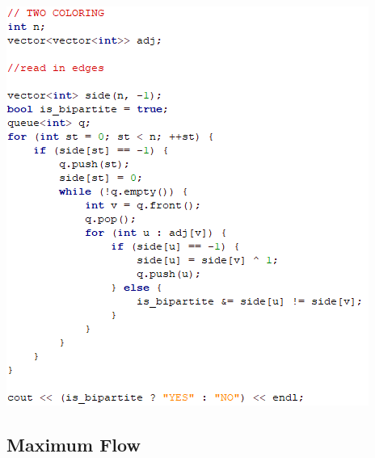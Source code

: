 \documentclass[11pt,twocolumn]{article}
\begin{document}
\includegraphics[scale=0.6]{twocoloring}

\subsection{Maximum Flow}
\end{document}
